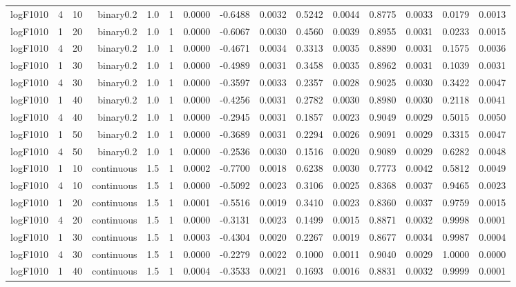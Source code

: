 \begin{longtable}{rrrrrrrrrrrrrrr}
  logF1010 & 4 & 10 & binary0.2 & 1.0 & 1 & 0.0000 & -0.6488 & 0.0032 & 0.5242 & 0.0044 & 0.8775 & 0.0033 & 0.0179 & 0.0013 \\ 
  logF1010 & 1 & 20 & binary0.2 & 1.0 & 1 & 0.0000 & -0.6067 & 0.0030 & 0.4560 & 0.0039 & 0.8955 & 0.0031 & 0.0233 & 0.0015 \\ 
  logF1010 & 4 & 20 & binary0.2 & 1.0 & 1 & 0.0000 & -0.4671 & 0.0034 & 0.3313 & 0.0035 & 0.8890 & 0.0031 & 0.1575 & 0.0036 \\ 
  logF1010 & 1 & 30 & binary0.2 & 1.0 & 1 & 0.0000 & -0.4989 & 0.0031 & 0.3458 & 0.0035 & 0.8962 & 0.0031 & 0.1039 & 0.0031 \\ 
  logF1010 & 4 & 30 & binary0.2 & 1.0 & 1 & 0.0000 & -0.3597 & 0.0033 & 0.2357 & 0.0028 & 0.9025 & 0.0030 & 0.3422 & 0.0047 \\ 
  logF1010 & 1 & 40 & binary0.2 & 1.0 & 1 & 0.0000 & -0.4256 & 0.0031 & 0.2782 & 0.0030 & 0.8980 & 0.0030 & 0.2118 & 0.0041 \\ 
  logF1010 & 4 & 40 & binary0.2 & 1.0 & 1 & 0.0000 & -0.2945 & 0.0031 & 0.1857 & 0.0023 & 0.9049 & 0.0029 & 0.5015 & 0.0050 \\ 
  logF1010 & 1 & 50 & binary0.2 & 1.0 & 1 & 0.0000 & -0.3689 & 0.0031 & 0.2294 & 0.0026 & 0.9091 & 0.0029 & 0.3315 & 0.0047 \\ 
  logF1010 & 4 & 50 & binary0.2 & 1.0 & 1 & 0.0000 & -0.2536 & 0.0030 & 0.1516 & 0.0020 & 0.9089 & 0.0029 & 0.6282 & 0.0048 \\ 
  logF1010 & 1 & 10 & continuous & 1.5 & 1 & 0.0002 & -0.7700 & 0.0018 & 0.6238 & 0.0030 & 0.7773 & 0.0042 & 0.5812 & 0.0049 \\ 
  logF1010 & 4 & 10 & continuous & 1.5 & 1 & 0.0000 & -0.5092 & 0.0023 & 0.3106 & 0.0025 & 0.8368 & 0.0037 & 0.9465 & 0.0023 \\ 
  logF1010 & 1 & 20 & continuous & 1.5 & 1 & 0.0001 & -0.5516 & 0.0019 & 0.3410 & 0.0023 & 0.8360 & 0.0037 & 0.9759 & 0.0015 \\ 
  logF1010 & 4 & 20 & continuous & 1.5 & 1 & 0.0000 & -0.3131 & 0.0023 & 0.1499 & 0.0015 & 0.8871 & 0.0032 & 0.9998 & 0.0001 \\ 
  logF1010 & 1 & 30 & continuous & 1.5 & 1 & 0.0003 & -0.4304 & 0.0020 & 0.2267 & 0.0019 & 0.8677 & 0.0034 & 0.9987 & 0.0004 \\ 
  logF1010 & 4 & 30 & continuous & 1.5 & 1 & 0.0000 & -0.2279 & 0.0022 & 0.1000 & 0.0011 & 0.9040 & 0.0029 & 1.0000 & 0.0000 \\ 
  logF1010 & 1 & 40 & continuous & 1.5 & 1 & 0.0004 & -0.3533 & 0.0021 & 0.1693 & 0.0016 & 0.8831 & 0.0032 & 0.9999 & 0.0001 \\ 

\end{longtable}
